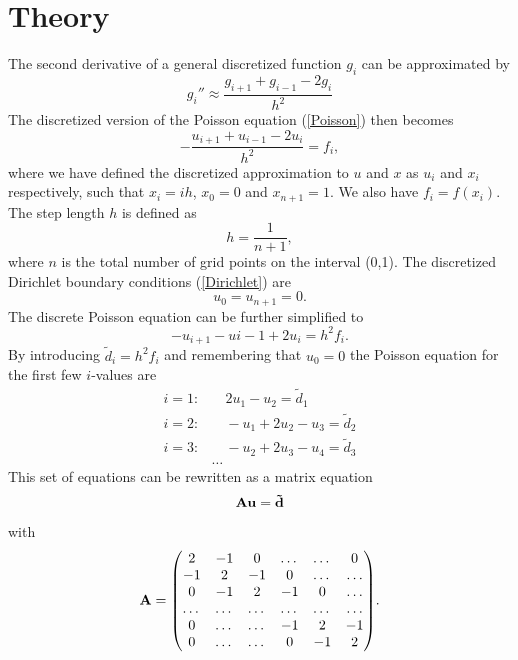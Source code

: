 \documentclass[notitlepage, reprint, nofootinbib]{revtex4-1}
\begin{document}
\section{Theory}
The second derivative of a general discretized function $g_i$ can be approximated by 
\begin{equation}\label{second_derivative} g_i'' \approx \frac{g_{i+1}+g_{i-1}-2g_i}{h^2}\end{equation}
The discretized version of the Poisson equation (\ref{Poisson}) then becomes 
\begin{equation}\label{Poisson_discrete}-\frac{u_{i+1}+u_{i-1}-2u_i}{h^2}=f_i,\end{equation}
where we have defined the discretized approximation to $u$ and $x$ as $u_i$ and $x_i$ respectively, such that $x_i=ih$, $x_0=0$ and $x_{n+1}=1$. We also have $f_i=f(x_i)$. The step length $h$ is defined as 
\begin{equation}\label{step_length}h=\frac{1}{n+1},\end{equation}
where $n$ is the total number of grid points on the interval (0,1). The discretized Dirichlet boundary conditions (\ref{Dirichlet}) are
\begin{equation}\label{Dirichlet2}u_0=u_{n+1}=0.\end{equation}
The discrete Poisson equation can be further simplified to
$$-u_{i+1}-u{i-1}+2u_i=h^2f_i.$$
By introducing $\tilde{d}_i=h^2f_i$ and remembering that $u_0=0$ the Poisson equation for the first few $i$-values are
\begin{align*}
	i=1:&\quad 2u_1-u_2=\tilde{d}_1\\
	i=2:&\quad -u_1+2u_2-u_3=\tilde{d}_2\\
	i=3:&\quad -u_2+2u_3-u_4=\tilde{d}_3\\
	&\dots
\end{align*}
This set of equations can be rewritten as a matrix equation 
\begin{equation}\label{lil_boi}\vb{A}\vb{u}=\vb{\tilde{d}}\end{equation}
with
\begin{equation}\label{big_boi}\vb{A}=\mqty( 2 & -1  & 0 &\dots &\dots &0\\-1&2&-1&0&\dots&\dots\\0&-1&2&-1&0&\dots\\ \dots&\dots&\dots&\dots&\dots&\dots \\ 0&\dots&\dots&-1&2&-1\\ 0&\dots&\dots&0&-1&2 ).\end{equation}
\newpage
\end{document}
